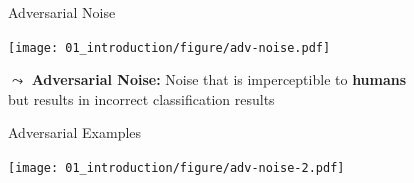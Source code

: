 \documentclass[aspectratio=169]{../latex_main/tntbeamer}  %
\begin{document}
	
\begin{frame}[c]{Adversarial Noise~}
    
    \centering
    \texttt{[image: 01\_introduction/figure/adv-noise.pdf]}
	
	$\leadsto$ \textbf{Adversarial Noise:} Noise that is imperceptible to \textbf{humans}\\ but results in incorrect classification results
	
\end{frame}

\begin{frame}[c]{Adversarial Examples~}
    
    \centering
    \texttt{[image: 01\_introduction/figure/adv-noise-2.pdf]}
	
\end{frame}
\end{document}
